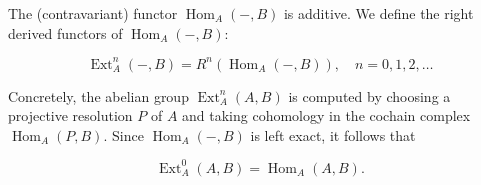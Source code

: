 The (contravariant) functor $\operatorname{Hom}_A(-, B)$ is additive. We define the right derived functors of $\operatorname{Hom}_A(-, B)$:

$$\operatorname{Ext}_A^n(-, B) = R^n(\operatorname{Hom}_A(-, B)), \quad n = 0, 1, 2, \dots$$

Concretely, the abelian group $\operatorname{Ext}_A^n(A, B)$ is computed by choosing a projective resolution $P$ of $A$ and taking cohomology in the cochain complex $\operatorname{Hom}_A(P, B)$. Since $\operatorname{Hom}_A(-, B)$ is left exact, it follows that

$$\operatorname{Ext}_A^0(A, B) = \operatorname{Hom}_A(A, B).$$
